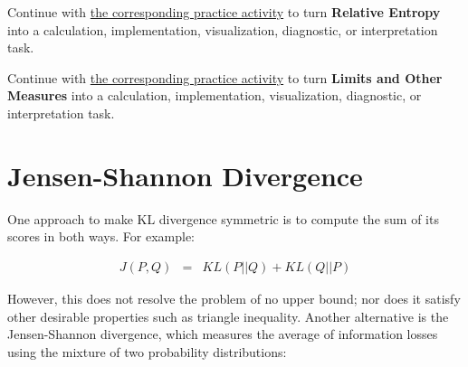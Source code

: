 \documentclass[
  letterpaper,
]{scrbook}
\begin{document}
\begin{tcolorbox}[enhanced jigsaw, arc=.35mm, bottomrule=.15mm, bottomtitle=1mm, breakable, colback=white, colbacktitle=quarto-callout-tip-color!10!white, colframe=quarto-callout-tip-color-frame, coltitle=black, left=2mm, leftrule=.75mm, opacityback=0, opacitybacktitle=0.6, rightrule=.15mm, title=\textcolor{quarto-callout-tip-color}{\faLightbulb}\hspace{0.5em}{Put it into practice}, titlerule=0mm, toprule=.15mm, toptitle=1mm]

Continue with \hyperref[sec-pr-05-relative-entropy]{the corresponding
practice activity} to turn \textbf{Relative Entropy} into a calculation,
implementation, visualization, diagnostic, or interpretation task.

\end{tcolorbox}

\begin{tcolorbox}[enhanced jigsaw, arc=.35mm, bottomrule=.15mm, bottomtitle=1mm, breakable, colback=white, colbacktitle=quarto-callout-tip-color!10!white, colframe=quarto-callout-tip-color-frame, coltitle=black, left=2mm, leftrule=.75mm, opacityback=0, opacitybacktitle=0.6, rightrule=.15mm, title=\textcolor{quarto-callout-tip-color}{\faLightbulb}\hspace{0.5em}{Put it into practice}, titlerule=0mm, toprule=.15mm, toptitle=1mm]

Continue with \hyperref[sec-pr-05-limits-and-other-measures]{the
corresponding practice activity} to turn \textbf{Limits and Other
Measures} into a calculation, implementation, visualization, diagnostic,
or interpretation task.

\end{tcolorbox}

\section{Jensen-Shannon Divergence}\label{jensen-shannon-divergence}

One approach to make KL divergence symmetric is to compute the sum of
its scores in both ways. For example:

\[\begin{aligned}
  J(P, Q) & = & KL(P||Q) + KL(Q||P)
\end{aligned}\]

However, this does not resolve the problem of no upper bound; nor does
it satisfy other desirable properties such as triangle inequality.
Another alternative is the Jensen-Shannon divergence, which measures the
average of information losses using the mixture of two probability
distributions:
\end{document}
